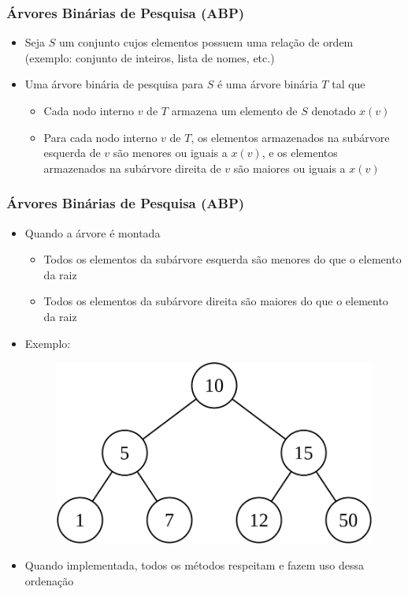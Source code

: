 \documentclass[aspectratio=169]{beamer}
\begin{document}
\begin{frame}\frametitle{Árvores Binárias de Pesquisa (ABP)}
\begin{itemize}
	\item Seja $S$ um conjunto cujos elementos possuem uma relação de ordem (exemplo: conjunto de inteiros, lista de nomes, etc.)
	\item Uma árvore binária de pesquisa para $S$ é uma árvore binária $T$ tal que
	\begin{itemize}
		\item Cada nodo interno $v$ de $T$ armazena um elemento de $S$ denotado $x(v)$
		\item Para cada nodo interno $v$ de $T$, os elementos armazenados na subárvore esquerda de $v$ são menores ou iguais a $x(v)$, e os elementos armazenados na subárvore direita de $v$ são maiores ou iguais a $x(v)$
	\end{itemize}
\end{itemize}
\end{frame}

\begin{frame}\frametitle{Árvores Binárias de Pesquisa (ABP)}
\begin{itemize}
	\item Quando a árvore é montada
	\begin{itemize}
		\item Todos os elementos da subárvore esquerda são menores do que o elemento da raiz
		\item Todos os elementos da subárvore direita são maiores do que o elemento da raiz
	\end{itemize}
	\item Exemplo:
\begin{figure}[h]
	\centering
	\includegraphics[height=0.3\paperheight]{imagens/abp01.png}
\end{figure}
	\item Quando implementada, todos os métodos respeitam e fazem uso dessa ordenação
\end{itemize}
\end{frame}
\end{document}
